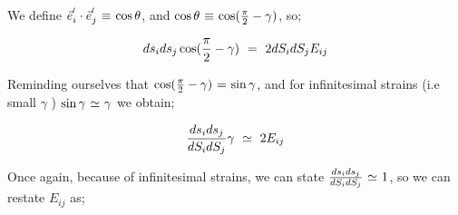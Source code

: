 \documentclass{article}
\begin{document}
We define \begin{math} \vec{e}_i^{\vspace{0.025cm} '} \cdot \vec{e}_j^{\vspace{0.025cm} '} \hspace{0.025cm} \equiv \hspace{0.025cm} \cos{\theta} \end{math}, and \begin{math} \cos{\theta} \hspace{0.025cm} \equiv \hspace{0.025cm} \cos(\frac{\pi}{2} - \gamma) \end{math}, so;

\begin{equation} \label{eq:1}
ds_i ds_j \cos(\frac{\pi}{2} - \gamma) \hspace{0.125cm} = \hspace{0.125cm} 2 dS_i dS_j E_{i j} 
\end{equation} 

Reminding ourselves that \begin{math} \cos(\frac{\pi}{2} - \gamma) \hspace{0.025cm} = \hspace{0.025cm} \sin{ \gamma } \end{math}, and for infinitesimal strains (i.e small  \begin{math} \gamma \end{math} ) \begin{math} \sin{ \gamma } \hspace{0.025cm} \simeq \hspace{0.025cm} \gamma \end{math} we obtain;

\begin{equation} \label{eq:1}
\frac{ds_i ds_j}{dS_i dS_j} \gamma \hspace{0.125cm} \simeq \hspace{0.125cm} 2 E_{i j} 
\end{equation} 

Once again, because of infinitesimal strains, we can state \begin{math} \frac{ds_i ds_j}{dS_i dS_j} \hspace{0.025cm} \simeq \hspace{0.025cm} 1 \end{math}, so we can restate \begin{math} E_{i j} \end{math} as;
\end{document}
